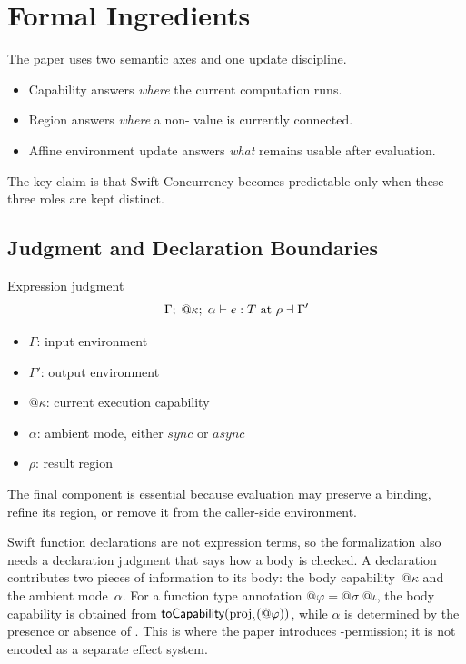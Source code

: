 \section{Formal Ingredients}
\label{sec:model}

The paper uses two semantic axes and one update discipline.

\begin{itemize}
  \item Capability answers \emph{where} the current computation runs.
  \item Region answers \emph{where} a non- value is currently connected.
  \item Affine environment update answers \emph{what} remains usable after evaluation.
\end{itemize}

The key claim is that Swift Concurrency becomes predictable only when these three roles are kept distinct.

\subsection{Judgment and Declaration Boundaries}

\begin{rulebox}{Expression judgment}
\[
  \Gamma;\; @\kappa;\; \alpha \vdash e : T \text{ at } \rho \dashv \Gamma'
\]

\begin{itemize}
  \item $\Gamma$: input environment
  \item $\Gamma'$: output environment
  \item $@\kappa$: current execution capability
  \item $\alpha$: ambient mode, either $\mathit{sync}$ or $\mathit{async}$
  \item $\rho$: result region
\end{itemize}

The final component is essential because evaluation may preserve a binding, refine its region, or remove it from the caller-side environment.
\end{rulebox}

Swift function declarations are not expression terms, so the formalization also needs a declaration judgment that says how a body is checked. A declaration contributes two pieces of information to its body: the body capability~$@\kappa$ and the ambient mode~$\alpha$. For a function type annotation $@\varphi = @\sigma\; @\iota$, the body capability is obtained from $\textsf{toCapability}(\mathrm{proj}_\iota(@\varphi))$, while $\alpha$ is determined by the presence or absence of . This is where the paper introduces -permission; it is not encoded as a separate effect system.

